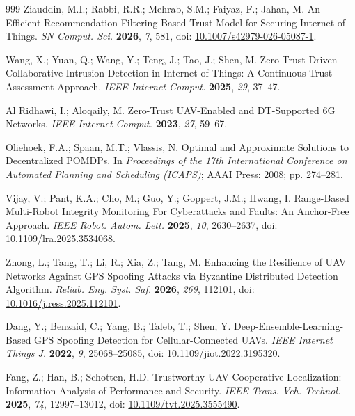 \documentclass[notspecified,article,submit,moreauthors]{Definitions/mdpi}
\begin{document}
\begin{thebibliography}{999}
Ziauddin, M.I.; Rabbi, R.R.; Mehrab, S.M.; Faiyaz, F.; Jahan, M. An Efficient Recommendation Filtering-Based Trust Model for Securing Internet of Things. {\em SN Comput. Sci.} {\bf 2026}, {\em 7}, 581, doi: \href{https://doi.org/10.1007/s42979-026-05087-1}{10.1007/s42979-026-05087-1}.

Wang, X.; Yuan, Q.; Wang, Y.; Teng, J.; Tao, J.; Shen, M. Zero Trust-Driven Collaborative Intrusion Detection in Internet of Things: A Continuous Trust Assessment Approach. {\em IEEE Internet Comput.} {\bf 2025}, {\em 29}, 37--47.

Al Ridhawi, I.; Aloqaily, M. Zero-Trust UAV-Enabled and DT-Supported 6G Networks. {\em IEEE Internet Comput.} {\bf 2023}, {\em 27}, 59--67.












Oliehoek, F.A.; Spaan, M.T.; Vlassis, N. Optimal and Approximate Solutions to Decentralized POMDPs. In {\em Proceedings of the 17th International Conference on Automated Planning and Scheduling (ICAPS)}; AAAI Press: 2008; pp. 274--281.




Vijay, V.; Pant, K.A.; Cho, M.; Guo, Y.; Goppert, J.M.; Hwang, I. Range-Based Multi-Robot Integrity Monitoring For Cyberattacks and Faults: An Anchor-Free Approach. {\em IEEE Robot. Autom. Lett.} {\bf 2025}, {\em 10}, 2630--2637, doi: \href{https://doi.org/10.1109/lra.2025.3534068}{10.1109/lra.2025.3534068}.

Zhong, L.; Tang, T.; Li, R.; Xia, Z.; Tang, M. Enhancing the Resilience of UAV Networks Against GPS Spoofing Attacks via Byzantine Distributed Detection Algorithm. {\em Reliab. Eng. Syst. Saf.} {\bf 2026}, {\em 269}, 112101, doi: \href{https://doi.org/10.1016/j.ress.2025.112101}{10.1016/j.ress.2025.112101}.

Dang, Y.; Benzaid, C.; Yang, B.; Taleb, T.; Shen, Y. Deep-Ensemble-Learning-Based GPS Spoofing Detection for Cellular-Connected UAVs. {\em IEEE Internet Things J.} {\bf 2022}, {\em 9}, 25068--25085, doi: \href{https://doi.org/10.1109/jiot.2022.3195320}{10.1109/jiot.2022.3195320}.

Fang, Z.; Han, B.; Schotten, H.D. Trustworthy UAV Cooperative Localization: Information Analysis of Performance and Security. {\em IEEE Trans. Veh. Technol.} {\bf 2025}, {\em 74}, 12997--13012, doi: \href{https://doi.org/10.1109/tvt.2025.3555490}{10.1109/tvt.2025.3555490}.


\end{thebibliography}
\end{document}
